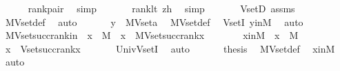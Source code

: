 \begin{isabellebody}
\ \ \ \ \isamarkupfalse%
\ rank{\isacharunderscore}{\kern0pt}pair{}\ \isamarkupfalse%
\ simp\ \isanewline
\ \ \ \ \isamarkupfalse%
\ rank{\isacharunderscore}{\kern0pt}lt\ zh\ \isamarkupfalse%
\ simp\ \isanewline
\ \ \ \ \isamarkupfalse%
\ VsetD\ assms\ \isamarkupfalse%
\ MVset{\isacharunderscore}{\kern0pt}def\ \isamarkupfalse%
\ auto\ \isanewline
\ \ \isamarkupfalse%
\ \isamarkupfalse%
\ {\isachardoublequoteopen}y\ {\isasymin}\ MVset{\isacharparenleft}{\kern0pt}a{\isacharparenright}{\kern0pt}{\isachardoublequoteclose}\ \isamarkupfalse%
\ MVset{\isacharunderscore}{\kern0pt}def\ \isamarkupfalse%
\ VsetI\ yinM\ \isamarkupfalse%
\ auto\ \isanewline
{}\isamarkupfalse%
%
\endisatagproof
{\isafoldproof}%
%
\isadelimproof
\isanewline
%
\endisadelimproof
\isanewline
{}\isamarkupfalse%
\ MVset{\isacharunderscore}{\kern0pt}succ{\isacharunderscore}{\kern0pt}rank{\isacharunderscore}{\kern0pt}in\ {\isacharcolon}{\kern0pt}\ {\isachardoublequoteopen}x\ {\isasymin}\ M\ {\isasymLongrightarrow}\ x\ {\isasymin}\ MVset{\isacharparenleft}{\kern0pt}succ{\isacharparenleft}{\kern0pt}rank{\isacharparenleft}{\kern0pt}x{\isacharparenright}{\kern0pt}{\isacharparenright}{\kern0pt}{\isacharparenright}{\kern0pt}{\isachardoublequoteclose}\ \isanewline
%
\isadelimproof
%
\endisadelimproof
%
\isatagproof
{}\isamarkupfalse%
\ {\isacharminus}{\kern0pt}\ \isanewline
\ \ \isamarkupfalse%
\ xinM\ {\isacharcolon}{\kern0pt}\ {\isachardoublequoteopen}x\ {\isasymin}\ M{\isachardoublequoteclose}\ \isanewline
\ \ \isamarkupfalse%
\ {\isachardoublequoteopen}x\ {\isasymin}\ Vset{\isacharparenleft}{\kern0pt}succ{\isacharparenleft}{\kern0pt}rank{\isacharparenleft}{\kern0pt}x{\isacharparenright}{\kern0pt}{\isacharparenright}{\kern0pt}{\isacharparenright}{\kern0pt}{\isachardoublequoteclose}\ \isanewline
\ \ \ \ \isamarkupfalse%
\ Univ{\isachardot}{\kern0pt}VsetI\ \isamarkupfalse%
\ auto\ \isanewline
\ \ \isamarkupfalse%
\ \isamarkupfalse%
\ {\isacharquery}{\kern0pt}thesis\ \isamarkupfalse%
\ MVset{\isacharunderscore}{\kern0pt}def\ \isamarkupfalse%
\ xinM\ \isamarkupfalse%
\ auto\ \isanewline
{}\isamarkupfalse%
%
\endisatagproof
{\isafoldproof}%
%
\isadelimproof
\ \isanewline

\end{isabellebody}

